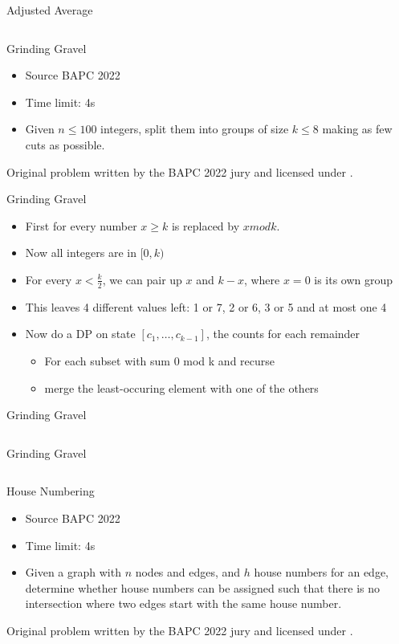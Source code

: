 \documentclass[11pt,pdf, aspectratio=169]{beamer}
\begin{document}
  \begin{frame}[containsverbatim]{Adjusted Average}
    \inputminted[fontsize=\tiny]{python}{code/session-4/bapc-a-3.py}
  \end{frame}
  \begin{frame}{Grinding Gravel}
    \begin{itemize}
      \item Source BAPC 2022
      \item Time limit: 4s
      \item  Given $n \leq 100$ integers, split them into groups of size $k \leq 8$ making as few cuts as possible.
    \end{itemize}
    Original problem written by the BAPC 2022 jury and licensed under \doclicenseLongNameRef.

    \doclicenseImage
  \end{frame}
  \begin{frame}{Grinding Gravel}
    \begin{itemize}
      \item First for every number $x \geq k$ is replaced by $x mod k$.
      \item Now all integers are in $[0,k)$
      \item For every $x < \frac{k}{2}$, we can pair up $x$ and $k-x$, where $x=0$ is its own group
      \item This leaves 4 different values left: 1 or 7, 2 or 6, 3 or 5 and at most one 4
      \item Now do a DP on state $[c_1, \ldots, c_{k-1}]$, the counts for each remainder
      \begin{itemize}
        \item For each subset with sum 0 mod k and recurse
        \item merge the least-occuring element with one of the others
      \end{itemize}
    \end{itemize}
  \end{frame}
  \begin{frame}[containsverbatim]{Grinding Gravel}
    \inputminted[fontsize=\tiny]{python}{code/session-4/bapc-g-1.py}
  \end{frame}
  \begin{frame}[containsverbatim]{Grinding Gravel}
    \inputminted[fontsize=\tiny]{python}{code/session-4/bapc-g-2.py}
  \end{frame}
  \begin{frame}{House Numbering}
    \begin{itemize}
      \item Source BAPC 2022
      \item Time limit: 4s
      \item Given a graph with $n$ nodes and edges, and $h$ house numbers for an edge, determine whether house numbers can be assigned such that there is no intersection where two edges start with the same house number.
    \end{itemize}
    Original problem written by the BAPC 2022 jury and licensed under \doclicenseLongNameRef.

    \doclicenseImage
  \end{frame}
\end{document}
